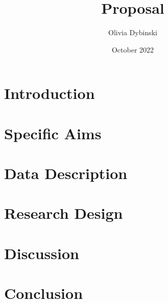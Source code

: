 \documentclass[12pt]{article}
\title{Proposal}
\author{Olivia Dybinski\\}
\date{October 2022}
\begin{document}
 \maketitle


 \section{Introduction} 
 \label{sec:intro}



 \section{Specific Aims}
 \label{sec:aims}

 

 \section{Data Description}
 \label{sec:data}

 

 \section{Research Design}
 \label{sec:research}

 

 \section{Discussion}
 \label{sec:disc}


 \section{Conclusion}
 \label{sec:con}
 

 
 
\end{document}
